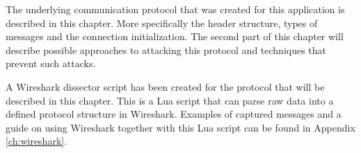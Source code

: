 The underlying communication protocol that was created for this application is described in this chapter. More specifically the header structure, types of messages and the connection initialization. The second part of this chapter will describe possible approaches to attacking this protocol and techniques that prevent such attacks.

A Wireshark dissector script has been created for the protocol that will be described in this chapter. This is a Lua script that can parse raw data into a defined protocol structure in Wireshark. Examples of captured messages and a guide on using Wireshark together with this Lua script can be found in Appendix \ref{ch:wireshark}.
